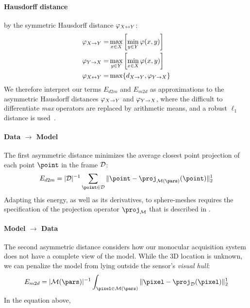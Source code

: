 \paragraph{Hausdorff distance} 
by the symmetric Hausdorff distance $\varphi_{X \leftrightarrow Y}$:
% 
\begin{eqnarray*}
\varphi_{X \rightarrow Y} =& \max_{x \in X} \left[ \min_{y \in Y} \varphi(x,y) \right] \\
\varphi_{Y \rightarrow X} =& \max_{y \in Y} \left[ \min_{x \in X} \varphi(x,y) \right] \\
\varphi_{X \leftrightarrow Y} =& \max \{ d_{X \rightarrow Y}, \varphi_{Y \rightarrow X} \}
\end{eqnarray*}
We therefore interpret our terms $E_{d2m}$ and $E_{m2d}$ as approximations to the asymmetric Hausdorff distances $\varphi_{X \rightarrow Y}$ and $\varphi_{Y \rightarrow X}$, where the difficult to differentiate \emph{max} operators are replaced by arithmetic means, and a robust $\ell_1$ distance is used~\cite{regcourse}.



\paragraph{Data $\rightarrow$ Model}
The first asymmetric distance minimizes the average closest point projection of each point $\point$ in the  frame $\mathcal{D}$:
%
\begin{equation}
E_{d2m} = |\depth|^{-1} \sum_{\point \in \depth} \| \point - \proj_{\model(\pars)}(\point)\|_2^1
\label{eq:d2m}
\end{equation}
% 
Adapting this energy, as well as its derivatives, to sphere-meshes requires the specification of the projection operator $\proj_\model$ that is described in .

\paragraph{Model $\rightarrow$ Data}
The second asymmetric distance considers how our monocular acquisition system does not have a complete view of the model. While the 3D location is unknown, we can penalize the model from lying outside the sensor's \emph{visual hull}:
\begin{equation}
E_{m2d} = |\model(\pars)|^{-1} \int_{\pixel \in \model(\pars)} \| \pixel - \proj_{\depth}(\pixel)\|_2^1
\label{eq:m2d}
\end{equation}
In the equation above, 
